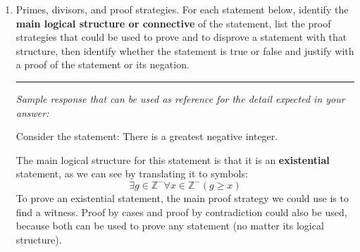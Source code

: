\documentclass[12pt, oneside]{article}
\begin{document}
\begin{enumerate}[labelindent=0pt, leftmargin=0pt]
    In this question, we'll consider the combination of these functions with a new function, one 
    that removes the element at the front of the list (if there is any). We define $remove: L \to L$
    by
    \[
        \begin{array}{ll}
            \textrm{Basis Step: } & remove([]) = [] \\
            \textrm{Recursive Step: } & \textrm{If } l \in L\textrm{ and }n \in \mathbb{N} \textrm{, then } remove(~(n, l)~) = l
        \end{array}        
    \]
    \begin{enumerate}
        \item What is the result of $remove(~append(~(prepend~(~(~(10,[]), 5~)~), 20)~)~)$? 
        For full credit, include all intermediate steps with brief justifications for each.
        \item Prove the statement
        \[
            \forall l \in L \left(~ remove( prepend(~(l,0)~)) = l ~\right) 
        \]
        \item Disprove the statement
        \[
            \forall l \in L \left(~ remove( append(~(l,0)~)) = l ~\right) 
        \]
    \end{enumerate}

    \item Primes, divisors, and proof strategies. For each statement below, identify the {\bf main logical structure or connective} of the 
    statement, list the proof strategies that could be used to prove and to disprove a statement with that structure, 
    then identify whether the statement is true or false and justify with a proof of the statement or its negation. 


    \rule{0.5\textwidth}{.4pt}
    
    {\it Sample response that can be used as reference for the detail expected 
    in your answer:} 

    Consider the statement: There is a greatest negative integer.

    The main logical structure for this statement is that it is an {\bf existential} statement, as we can 
    see by translating it to symbols: 
    \[
        \exists g \in \mathbb{Z}^{-} \forall x \in \mathbb{Z}^{-} ( g \geq x)
    \]
    To prove an existential statement, the main proof strategy we could use is to find a witness. 
    Proof by cases and proof by contradiction could also be used, because 
    both can be used to prove any statement (no matter its logical structure).


\end{enumerate}
\end{document}
